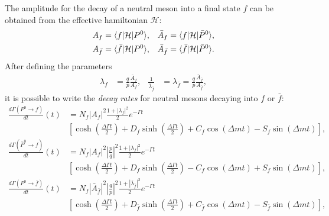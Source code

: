The amplitude for the decay of a neutral meson into a final state $f$ can be obtained from the effective hamiltonian $\mathcal H$:
\begin{align}
	A_f &= \langle f|\mathcal H |P^0\rangle, & \bar A_f &= \langle f|\mathcal H |\bar P^0\rangle, \\
	A_{\bar f} &= \langle \bar f|\mathcal H |P^0\rangle, & \bar A_{\bar f} &= \langle \bar f|\mathcal H |\bar P^0\rangle.
\end{align}
After defining the parameters
\begin{align}
	\lambda_f &= \frac{q}{p}\frac{\bar A_f}{A_f}, & \frac{1}{\bar\lambda_{\bar f}} &= \lambda_{\bar f} = \frac{q}{p}\frac{\bar A_{\bar f}}{A_{\bar f}},
\end{align}
it is possible to write the \emph{decay rates} for neutral mesons decaying into $f$ or $\bar f$: 
\begin{equation}
	\label{eq:P0tof}
	\begin{split}
		\frac{d\Gamma(P^0\to f)}{dt}(t) &= N_f |A_f|^2 \frac{1+|\lambda_f|^2}{2}e^{-\Gamma t} \\
		& \left[ \cosh\left(\frac{\Delta\Gamma t}{2}\right) + D_f \sinh\left(\frac{\Delta\Gamma t}{2}\right) + C_f \cos \left( \Delta m t \right) - S_f \sin \left( \Delta m t \right) \right],   
	\end{split}
\end{equation}
\begin{equation}
	\label{eq:P0bartof}
	\begin{split}
		\frac{d\Gamma(\bar P^0\to f)}{dt}(t) &= N_f |A_f|^2 \left|\frac{p}{q}\right|^2 \frac{1+|\lambda_f|^2}{2}e^{-\Gamma t} \\
		& \left[ \cosh\left(\frac{\Delta\Gamma t}{2}\right) + D_f \sinh\left(\frac{\Delta\Gamma t}{2}\right) - C_f \cos \left( \Delta m t \right) + S_f \sin \left( \Delta m t \right) \right],   
	\end{split}
\end{equation}
\begin{equation}
	\label{eq:P0tofbar}
	\begin{split}
		\frac{d\Gamma(P^0\to \bar f)}{dt}(t) &= N_f |\bar A_{\bar f}|^2 \left|\frac{q}{p}\right|^2 \frac{1+|\bar \lambda_{\bar f}|^2}{2}e^{-\Gamma t} \\
		& \left[ \cosh\left(\frac{\Delta\Gamma t}{2}\right) + D_{\bar f} \sinh\left(\frac{\Delta\Gamma t}{2}\right) + C_{\bar f} \cos \left( \Delta m t \right) - S_{\bar f} \sin \left( \Delta m t \right) \right],   
	\end{split}
\end{equation}
